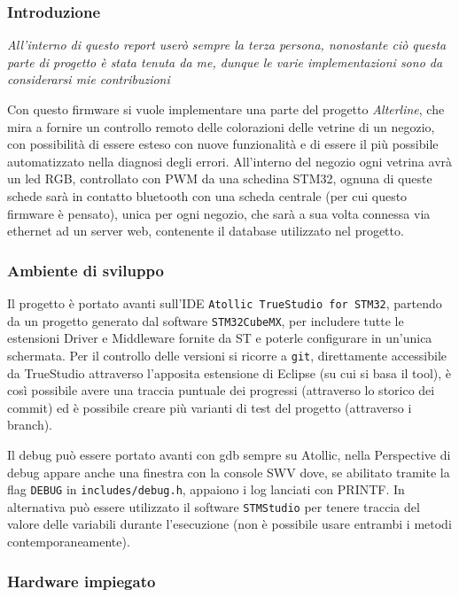 \subsubsection{Introduzione}

\emph{All'interno di questo report user\`o sempre la terza persona, nonostante ci\`o questa parte di progetto \`e stata tenuta da me, dunque le varie implementazioni sono da considerarsi mie contribuzioni}

Con questo firmware si vuole implementare una parte del progetto \textit{Alterline}, che mira a fornire un controllo remoto delle colorazioni delle vetrine di un negozio, con possibilit\`a di essere esteso con nuove funzionalit\`a e di essere il pi\`u possibile automatizzato nella diagnosi degli errori. All'interno del negozio ogni vetrina avr\`a un led RGB, controllato con PWM da una schedina STM32, ognuna di queste schede sar\`a in contatto bluetooth con una scheda centrale (per cui questo firmware \`e pensato), unica per ogni negozio, che sar\`a a sua volta connessa via ethernet ad un server web, contenente il database utilizzato nel progetto.

\subsubsection{Ambiente di sviluppo}

Il progetto \`e portato avanti sull'IDE \texttt{Atollic TrueStudio for STM32}, partendo da un progetto generato dal software \texttt{STM32CubeMX}, per includere tutte le estensioni Driver e Middleware fornite da ST e poterle configurare in un'unica schermata. Per il controllo delle versioni si ricorre a \texttt{git}, direttamente accessibile da TrueStudio attraverso l'apposita estensione di Eclipse (su cui si basa il tool), \`e cos\`i possibile avere una traccia puntuale dei progressi (attraverso lo storico dei commit) ed \`e possibile creare pi\`u varianti di test del progetto (attraverso i branch).

Il debug pu\`o essere portato avanti con gdb sempre su Atollic, nella Perspective di debug appare anche una finestra con la console SWV dove, se abilitato tramite la flag \texttt{DEBUG} in \texttt{includes/debug.h}, appaiono i log lanciati con PRINTF. In alternativa pu\`o essere utilizzato il software \texttt{STMStudio} per tenere traccia del valore delle variabili durante l'esecuzione (non \`e possibile usare entrambi i metodi contemporaneamente).

\subsubsection{Hardware impiegato}

